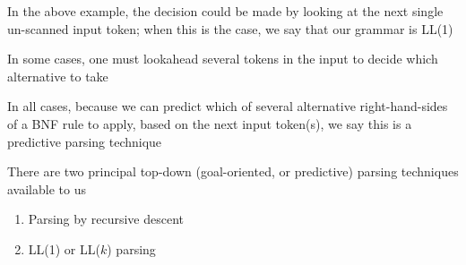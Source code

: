 \documentclass[8pt,a4paper,compress,handout]{beamer}
\begin{document}
\begin{frame}[fragile]
\pause

In the above example, the decision could be made by looking at the next single un-scanned input token; when this is the case, we say that our grammar is LL(1)

\pause
\bigskip

In some cases, one must lookahead several tokens in the input to decide which alternative to take

\pause
\bigskip

In all cases, because we can predict which of several alternative right-hand-sides of a BNF rule to apply, based on the next input token(s), we say this is a predictive parsing technique

\pause
\bigskip

There are two principal top-down (goal-oriented, or predictive) parsing techniques available to us
\begin{enumerate}
\item Parsing by recursive descent
\item LL(1) or LL($k$) parsing
\end{enumerate}
\end{frame}
\end{document}

